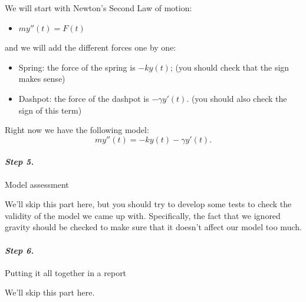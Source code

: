 \begin{example}
We will start with Newton's Second Law of motion:
\begin{itemize}
	\item $m y''(t) = F(t)$ \\
\end{itemize}

and we will  add the different forces one by one:
\begin{itemize}
	\item Spring: the force of the spring is \quad $- k y(t)$; \hfill (you should check that the sign makes sense)
	\item Dashpot: the force of the dashpot is \quad $- \gamma y'(t)$. \hfill (you should also check the sign of this term) \\
\end{itemize}

Right now we have the following model:
$$
m y''(t) = -ky(t) - \gamma y'(t).
$$

\end{example}



\paragraph{\emph{Step 5.}} Model assessment

We'll skip this part here, but you should try to develop some tests to check the validity of the model we came up with.
Specifically, the fact that we ignored gravity should be checked to make sure that it doesn't affect our model too much.

\paragraph{\emph{Step 6.}} Putting it all together in a report

We'll skip this part here.




